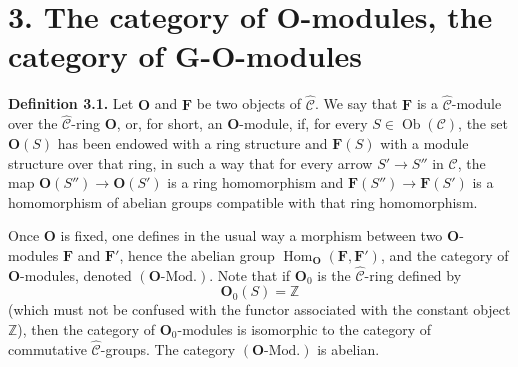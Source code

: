 
\section*{3. The category of \(\mathbf O\)-modules, the category of
\(\mathbf G\)-\(\mathbf O\)-modules}

\medskip
\noindent{}\textbf{Definition 3.1.}
Let \(\mathbf O\) and \(\mathbf F\) be two objects of
\(\widehat{\mathscr C}\). We say that \(\mathbf F\) is a
\(\widehat{\mathscr C}\)-module over the
\(\widehat{\mathscr C}\)-ring \(\mathbf O\), or, for short, an
\(\mathbf O\)-module, if, for every
\(S\in\operatorname{Ob}(\mathscr C)\), the set \(\mathbf O(S)\) has been
endowed with a ring structure and \(\mathbf F(S)\) with a module structure
over that ring, in such a way that for every arrow
\(S'\to S''\) in \(\mathscr C\), the map
\(\mathbf O(S'')\to\mathbf O(S')\) is a ring homomorphism and
\(\mathbf F(S'')\to\mathbf F(S')\) is a homomorphism of abelian groups
compatible with that ring homomorphism.

Once \(\mathbf O\) is fixed, one defines in the usual way a morphism between
two \(\mathbf O\)-modules \(\mathbf F\) and \(\mathbf F'\), hence the
abelian group
\(\operatorname{Hom}_{\mathbf O}(\mathbf F,\mathbf F')\), and the category
of \(\mathbf O\)-modules, denoted \((\mathbf O\text{-Mod.})\).
Note that if \(\mathbf O_0\) is the \(\widehat{\mathscr C}\)-ring defined by
\[
  \mathbf O_0(S)=\mathbb Z
\]
(which must not be confused with the functor associated with the constant
object \(\mathbb Z\)), then the category of \(\mathbf O_0\)-modules is
isomorphic to the category of commutative
\(\widehat{\mathscr C}\)-groups. The category \((\mathbf O\text{-Mod.})\) is
abelian.

